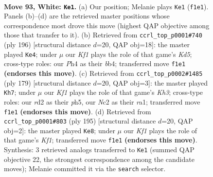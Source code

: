 \documentclass[11pt]{article}
\begin{document}
\clearpage

\begin{figure}[p]\centering
\begin{subfigure}{0.46\textwidth}\centering
\resizebox{\linewidth}{!}{%
\newchessgame
\chessboard[
  setfen={8/5kp1/5p2/7p/7P/6P1/1RNr4/5K2 w - - 10 93},
  showmover=false,
  pgfstyle=straightmove, color=movearrow, markmove={f1-e1}
]}
\caption{}
\end{subfigure}\hfill
\begin{subfigure}{0.46\textwidth}\centering
\resizebox{\linewidth}{!}{%
\newchessgame
\chessboard[
  setfen={6k1/5p2/5P2/p2K2P1/Pb1N3R/8/8/3r4 w - - 18 99},
  showmover=false,
  pgfstyle=straightmove, color=movearrow, markmove={d5-e4}
]}
\caption{}
\end{subfigure}
\\[4pt]
\begin{subfigure}{0.46\textwidth}\centering
\resizebox{\linewidth}{!}{%
\newchessgame
\chessboard[
  setfen={8/1r6/5p1k/4p2P/6P1/5PK1/8/R7 b - - 82 90},
  showmover=false,
  pgfstyle=straightmove, color=movearrow, markmove={h6-h7}
]}
\caption{}
\end{subfigure}\hfill
\begin{subfigure}{0.46\textwidth}\centering
\resizebox{\linewidth}{!}{%
\newchessgame
\chessboard[
  setfen={r4k2/1R3p2/5P1p/3KP2P/8/8/8/8 b - - 83 98},
  showmover=false,
  pgfstyle=straightmove, color=movearrow, markmove={f8-e8}
]}
\caption{}
\end{subfigure}
\caption{\textbf{Move 93, White: \texttt{Ke1}.} (a) Our position; Melanie plays \texttt{Ke1} (\texttt{f1e1}). Panels (b)--(d) are the retrieved master positions whose correspondence most drove this move (highest QAP objective among those that transfer to it). (b) Retrieved from \texttt{ccrl\_top\_p0001\#740} (ply 196) [structural distance $d$=20, QAP obj=18]: the master played \texttt{Ke4}; under $\mu$ our \emph{Kf1} plays the role of that game's \emph{Kd5}; cross-type roles: our \emph{P}h4 as their \emph{b}b4; transferred move \texttt{f1e1} \textbf{(endorses this move)}. (c) Retrieved from \texttt{ccrl\_top\_p0002\#1485} (ply 179) [structural distance $d$=20, QAP obj=3]: the master played \texttt{Kh7}; under $\mu$ our \emph{Kf1} plays the role of that game's \emph{Kh3}; cross-type roles: our \emph{r}d2 as their \emph{p}h5, our \emph{N}c2 as their \emph{r}a1; transferred move \texttt{f1e1} \textbf{(endorses this move)}. (d) Retrieved from \texttt{ccrl\_top\_p0001\#803} (ply 195) [structural distance $d$=20, QAP obj=2]: the master played \texttt{Ke8}; under $\mu$ our \emph{Kf1} plays the role of that game's \emph{Kf1}; transferred move \texttt{f1e1} \textbf{(endorses this move)}. Synthesis: 3 retrieved analogs transferred to \texttt{Ke1} (summed QAP objective 22, the strongest correspondence among the candidate moves); Melanie committed it via the \texttt{search} selector.}
\label{fig:thought-m184}
\end{figure}
\end{document}

